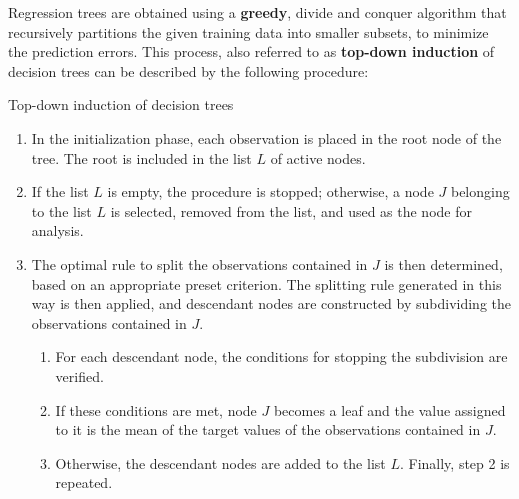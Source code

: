 Regression trees are obtained using a \textbf{greedy}, divide and conquer algorithm that recursively partitions the given training data into smaller subsets, to minimize the prediction errors. This process, also referred to as \textbf{top-down induction} of decision trees can be described by the following procedure: 
\begin{tcolorbox}[colback=blue!5, colframe=blue!80, colframe=white, boxrule=0pt]
\begin{algorithm}[H]
    \caption{Top-down induction of decision trees}
    \label{alg:tree_construction}
    \begin{enumerate}
        \item In the initialization phase, each observation is placed in the root node of the tree. The root is included in the list \( L \) of active nodes.
        \item If the list \( L \) is empty, the procedure is stopped; otherwise, a node \( J \) belonging to the list \( L \) is selected, removed from the list, and used as the node for analysis.
        \item The optimal rule to split the observations contained in \( J \) is then determined, based on an appropriate preset criterion. The splitting rule generated in this way is then applied, and descendant nodes are constructed by subdividing the observations contained in \( J \). 
        \begin{enumerate}
            \item For each descendant node, the conditions for stopping the subdivision are verified. 
            \item If these conditions are met, node \( J \) becomes a leaf and the value assigned to it is the mean of the target values of the observations contained in \( J \). 
            \item Otherwise, the descendant nodes are added to the list \( L \). Finally, step 2 is repeated.
        \end{enumerate}
    \end{enumerate}
\end{algorithm}
\end{tcolorbox}

